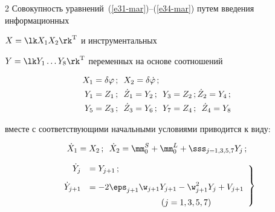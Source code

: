 \begin{multicols}{2}
Совокупность уравнений~(\ref{e31-mar})--(\ref{e34-mar}) путем введения информационных 


$X=\lk X_1 X_2\rk^{\mathrm{T}}$ и инструментальных


 $Y=\lk Y_1\ldots Y_8\rk^{\mathrm{T}}$ переменных на основе соотношений


    \begin{align*}


    X_1 &=\delta \varphi\,; \enskip X_2 =\delta \dot \varphi\,;\\


    Y_1 &= Z_1\,;\enskip \dot Z_1 = Y_2\,;\enskip Y_3 = Z_2\,; \dot Z_2 = Y_4\,;\\


    Y_5 &= Z_3\,; \enskip \dot Z_3 = Y_6\,;\enskip Y_7 = Z_4\,;\enskip \dot Z_4 = Y_{8}




    \end{align*}


вместе с соответствующими начальными условиями приводится к виду:


\begin{equation}


\dot X_1 = X_2\,;\enskip \dot X_2 = \mm_0^{S}+\mm_0^L + \sss_{j=1,3,5,7} Y_j\,;


\label{e37-mar}


\end{equation}





\noindent


\begin{equation}


\left.


\begin{array}{rl}


\dot Y_j &= Y_{j+1}\,;\\[9pt]


 \dot Y_{j+1}&= -2\eps_{j+1} \w_{j+1}Y_{j+1} -


    \w_{j+1}^2 Y_j +V_{j+1}\\[6pt]


    &\hspace*{30mm}(j=1,3,5,7)


    \end{array}


    \right\}


    \label{e38-mar}


    \end{equation}



\end{multicols}
